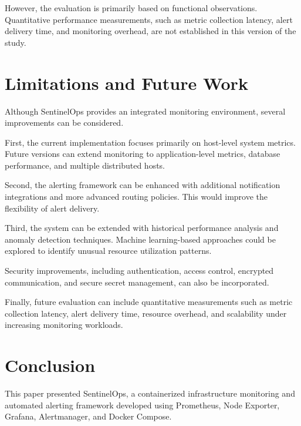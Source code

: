 \documentclass[conference]{IEEEtran}
\begin{document}
However, the evaluation is primarily based on functional
observations. Quantitative performance measurements,
such as metric collection latency, alert delivery time,
and monitoring overhead, are not established in this
version of the study.


\section{Limitations and Future Work}

Although SentinelOps provides an integrated monitoring
environment, several improvements can be considered.

First, the current implementation focuses primarily on
host-level system metrics. Future versions can extend
monitoring to application-level metrics, database
performance, and multiple distributed hosts.

Second, the alerting framework can be enhanced with
additional notification integrations and more advanced
routing policies. This would improve the flexibility
of alert delivery.

Third, the system can be extended with historical
performance analysis and anomaly detection techniques.
Machine learning-based approaches could be explored
to identify unusual resource utilization patterns.

Security improvements, including authentication,
access control, encrypted communication, and secure
secret management, can also be incorporated.

Finally, future evaluation can include quantitative
measurements such as metric collection latency,
alert delivery time, resource overhead, and scalability
under increasing monitoring workloads.


\section{Conclusion}

This paper presented SentinelOps, a containerized
infrastructure monitoring and automated alerting
framework developed using Prometheus, Node Exporter,
Grafana, Alertmanager, and Docker Compose.
\end{document}
